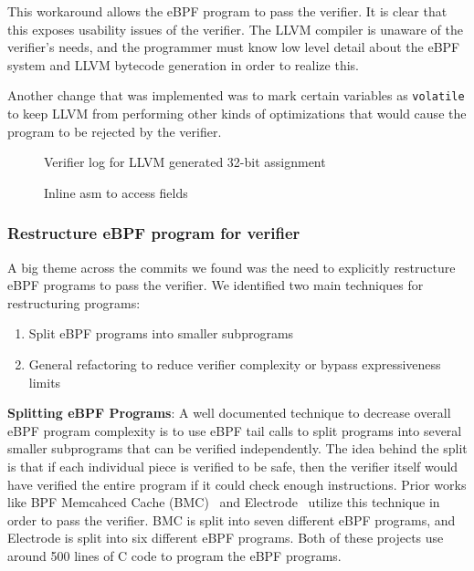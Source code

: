 This workaround allows the eBPF program to pass the verifier.
It is clear that this exposes usability issues of the verifier.
The LLVM compiler is unaware of the verifier's needs, and the programmer must know low level detail about the eBPF system and LLVM bytecode generation in order to realize this.

Another change that was implemented was to mark certain variables as \texttt{volatile}
to keep LLVM from performing other kinds of optimizations that would cause the program to be rejected by the verifier.

\begin{figure}
    
    \caption{Verifier log for LLVM generated 32-bit assignment}
    \label{fig:inline-error}
\end{figure}

\begin{figure}
    
    \caption{Inline asm to access fields}
    \label{fig:inline-asm}
\end{figure}


\subsubsection{Restructure eBPF program for verifier}
\label{motivation:restructure}
A big theme across the commits we found was the need to explicitly restructure eBPF programs to pass the verifier.
We identified two main techniques for restructuring programs:

\begin{enumerate}
    \item Split eBPF programs into smaller subprograms
    \item General refactoring to reduce verifier complexity or bypass expressiveness limits
\end{enumerate}

\noindent\textbf{Splitting eBPF Programs}:
A well documented technique to decrease overall eBPF program complexity is to use eBPF tail calls to split programs into several smaller subprograms that can be verified independently.
The idea behind the split is that if each individual piece is verified to be safe, then the verifier itself would have verified the entire program if it could check enough instructions.
Prior works like BPF Memcahced Cache (BMC)~\cite{BMC} and Electrode~\cite{Electrode} utilize this technique in order to pass the verifier.
BMC is split into seven different eBPF programs, and Electrode is split into six different eBPF programs.
Both of these projects use around 500 lines of C code to program the eBPF programs.


